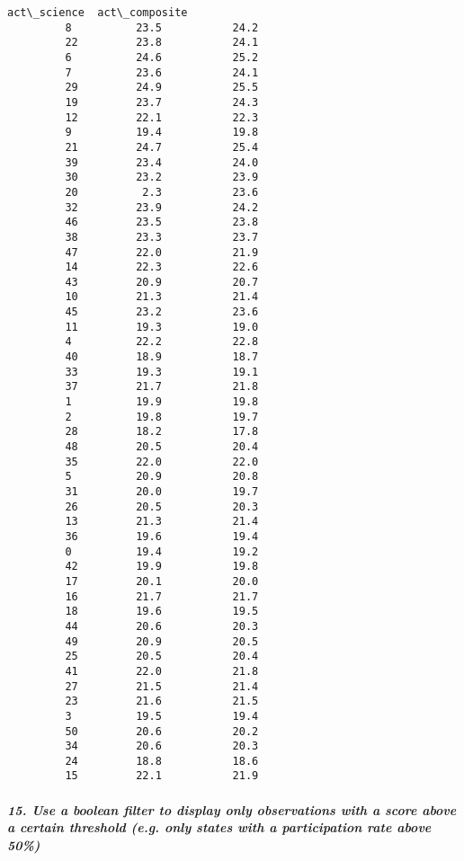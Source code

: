 \documentclass[11pt]{article}
\begin{document}
\begin{Verbatim}[commandchars=\\\{\}]
             act\_science  act\_composite  
         8          23.5           24.2  
         22         23.8           24.1  
         6          24.6           25.2  
         7          23.6           24.1  
         29         24.9           25.5  
         19         23.7           24.3  
         12         22.1           22.3  
         9          19.4           19.8  
         21         24.7           25.4  
         39         23.4           24.0  
         30         23.2           23.9  
         20          2.3           23.6  
         32         23.9           24.2  
         46         23.5           23.8  
         38         23.3           23.7  
         47         22.0           21.9  
         14         22.3           22.6  
         43         20.9           20.7  
         10         21.3           21.4  
         45         23.2           23.6  
         11         19.3           19.0  
         4          22.2           22.8  
         40         18.9           18.7  
         33         19.3           19.1  
         37         21.7           21.8  
         1          19.9           19.8  
         2          19.8           19.7  
         28         18.2           17.8  
         48         20.5           20.4  
         35         22.0           22.0  
         5          20.9           20.8  
         31         20.0           19.7  
         26         20.5           20.3  
         13         21.3           21.4  
         36         19.6           19.4  
         0          19.4           19.2  
         42         19.9           19.8  
         17         20.1           20.0  
         16         21.7           21.7  
         18         19.6           19.5  
         44         20.6           20.3  
         49         20.9           20.5  
         25         20.5           20.4  
         41         22.0           21.8  
         27         21.5           21.4  
         23         21.6           21.5  
         3          19.5           19.4  
         50         20.6           20.2  
         34         20.6           20.3  
         24         18.8           18.6  
         15         22.1           21.9  
\end{Verbatim}
            
    \subparagraph{15. Use a boolean filter to display only observations with
a score above a certain threshold (e.g. only states with a participation
rate above
50\%)}\label{use-a-boolean-filter-to-display-only-observations-with-a-score-above-a-certain-threshold-e.g.-only-states-with-a-participation-rate-above-50}
\end{document}
